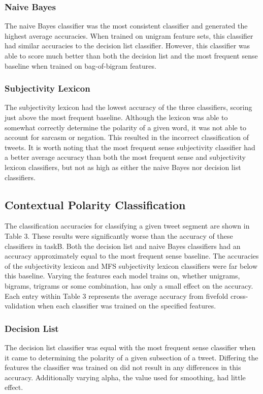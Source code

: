 \documentclass[11pt]{article}
\begin{document}
\subsubsection*{Naive Bayes}
The naive Bayes classifier was the most consistent classifier and generated the highest average accuracies. When trained on unigram feature sets, this classifier had similar accuracies to the decision list classifier. However, this classifier was able to score much better than both the decision list and the most frequent sense baseline when trained on bag-of-bigram features.

\subsubsection*{Subjectivity Lexicon}
The subjectivity lexicon had the lowest accuracy of the three classifiers, scoring just above the most frequent baseline. Although the lexicon was able to somewhat correctly determine the polarity of a given word, it was not able to account for sarcasm or negation. This resulted in the incorrect classification of tweets. It is worth noting that the most frequent sense subjectivity classifier had a better average accuracy than both the most frequent sense and subjectivity lexicon classifiers, but not as high as either the naive Bayes nor decision list classifiers. 

\subsection{Contextual Polarity Classification}
The classification accuracies for classifying a given tweet segment are shown in Table 3. These results were significantly worse than the accuracy of these classifiers in taskB. Both the decision list and naive Bayes classifiers had an accuracy approximately equal to the most frequent sense baseline. The accuracies of the subjectivity lexicon and MFS subjectivity lexicon classifiers were far below this baseline. Varying the features each model trains on, whether unigrams, bigrams, trigrams or some combination, has only a small effect on the accuracy. Each entry within Table 3 represents the average accuracy from fivefold cross-validation when each classifier was trained on the specified features. 

\subsubsection*{Decision List}
The decision list classifier was equal with the most frequent sense classifier when it came to determining the polarity of a given subsection of a tweet. Differing the features the classifier was trained on did not result in any differences in this accuracy. Additionally varying alpha, the value used for smoothing, had little effect.  
\end{document}
